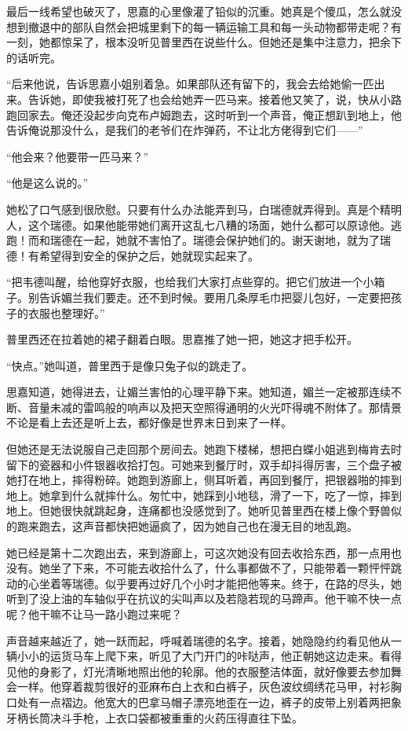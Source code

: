 \par 最后一线希望也破灭了，思嘉的心里像灌了铅似的沉重。她真是个傻瓜，怎么就没想到撤退中的部队自然会把城里剩下的每一辆运输工具和每一头动物都带走呢？有一刻，她都惊呆了，根本没听见普里西在说些什么。但她还是集中注意力，把余下的话听完。
\par “后来他说，告诉思嘉小姐别着急。如果部队还有留下的，我会去给她偷一匹出来。告诉她，即使我被打死了也会给她弄一匹马来。接着他又笑了，说，快从小路跑回家去。俺还没起步向克布卢姆跑去，这时听到一个声音，俺正想趴到地上，他告诉俺说那没什么，是我们的老爷们在炸弹药，不让北方佬得到它们——”
\par “他会来？他要带一匹马来？”
\par “他是这么说的。”
\par 她松了口气感到很欣慰。只要有什么办法能弄到马，白瑞德就弄得到。真是个精明人，这个瑞德。如果他能带她们离开这乱七八糟的场面，她什么都可以原谅他。逃跑！而和瑞德在一起，她就不害怕了。瑞德会保护她们的。谢天谢地，就为了瑞德！有希望得到安全的保护之后，她就现实起来了。
\par “把韦德叫醒，给他穿好衣服，也给我们大家打点些穿的。把它们放进一个小箱子。别告诉媚兰我们要走。还不到时候。要用几条厚毛巾把婴儿包好，一定要把孩子的衣服也整理好。”
\par 普里西还在拉着她的裙子翻着白眼。思嘉推了她一把，她这才把手松开。
\par “快点。”她叫道，普里西于是像只兔子似的跳走了。
\par 思嘉知道，她得进去，让媚兰害怕的心理平静下来。她知道，媚兰一定被那连续不断、音量未减的雷鸣般的响声以及把天空照得通明的火光吓得魂不附体了。那情景不论是看上去还是听上去，都好像是世界末日到来了一样。
\par 但她还是无法说服自己走回那个房间去。她跑下楼梯，想把白蝶小姐逃到梅肯去时留下的瓷器和小件银器收拾打包。可她来到餐厅时，双手却抖得厉害，三个盘子被她打在地上，摔得粉碎。她跑到游廊上，侧耳听着，再回到餐厅，把银器啪的摔到地上。她拿到什么就摔什么。匆忙中，她踩到小地毯，滑了一下，吃了一惊，摔到地上。但她很快就跳起身，连痛都也没感觉到了。她听见普里西在楼上像个野兽似的跑来跑去，这声音都快把她逼疯了，因为她自己也在漫无目的地乱跑。
\par 她已经是第十二次跑出去，来到游廊上，可这次她没有回去收拾东西，那一点用也没有。她坐了下来，不可能去收拾什么了，什么事都做不了，只能带着一颗怦怦跳动的心坐着等瑞德。似乎要再过好几个小时才能把他等来。终于，在路的尽头，她听到了没上油的车轴似乎在抗议的尖叫声以及若隐若现的马蹄声。他干嘛不快一点呢？他干嘛不让马一路小跑过来呢？
\par 声音越来越近了，她一跃而起，呼喊着瑞德的名字。接着，她隐隐约约看见他从一辆小小的运货马车上爬下来，听见了大门开门的咔哒声，他正朝她这边走来。看得见他的身影了，灯光清晰地照出他的轮廓。他的衣服整洁体面，就好像要去参加舞会一样。他穿着裁剪很好的亚麻布白上衣和白裤子，灰色波纹绸绣花马甲，衬衫胸口处有一点褶边。他宽大的巴拿马帽子漂亮地歪在一边，裤子的皮带上别着两把象牙柄长筒决斗手枪，上衣口袋都被重重的火药压得直往下坠。
